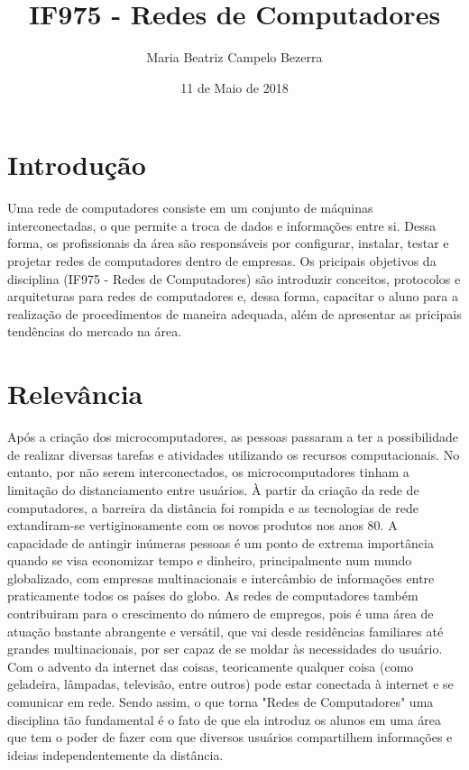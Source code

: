 \documentclass[10pt]{article}
\title{IF975 - Redes de Computadores}
\author{Maria Beatriz Campelo Bezerra}
\date{11 de Maio de 2018}
\begin{document}
\maketitle
\section{Introdução}

Uma rede de computadores consiste em um conjunto de máquinas interconectadas, o que permite a troca de dados e informações entre si. Dessa forma, os profissionais da área são responsáveis por configurar, instalar, testar e projetar redes de computadores dentro de empresas. Os pricipais objetivos da disciplina (IF975 - Redes de Computadores) são introduzir conceitos, protocolos e arquiteturas para redes de computadores e, dessa forma, capacitar o aluno para a realização de procedimentos de maneira adequada, além de apresentar as pricipais tendências do mercado na área. 

\section{Relevância}

Após a criação dos microcomputadores, as pessoas passaram a ter a possibilidade de realizar diversas tarefas e atividades utilizando os recursos computacionais. No entanto, por não serem interconectados, os microcomputadores tinham a limitação do distanciamento entre usuários. À partir da criação da rede de computadores, a barreira da distância foi rompida e as tecnologias de rede extandiram-se vertiginosamente com os novos produtos nos anos 80. A capacidade de antingir inúmeras pessoas é um ponto de extrema importância quando se visa economizar tempo e dinheiro, principalmente num mundo globalizado, com empresas multinacionais e intercâmbio de informações entre praticamente todos os países do globo. As redes de computadores também contribuiram para o crescimento do número de empregos, pois é uma área de atuação bastante abrangente e versátil, que vai desde residências familiares até grandes multinacionais, por ser capaz de se moldar às necessidades do usuário. Com o advento da internet das coisas, teoricamente qualquer coisa (como geladeira, lâmpadas, televisão, entre outros) pode estar conectada à internet e se comunicar em rede. Sendo assim, o que torna "Redes de Computadores" uma disciplina tão fundamental é o fato de que ela introduz os alunos em uma área que tem o poder de fazer com que diversos usuários compartilhem informações e ideias independentemente da distância.
\end{document}
